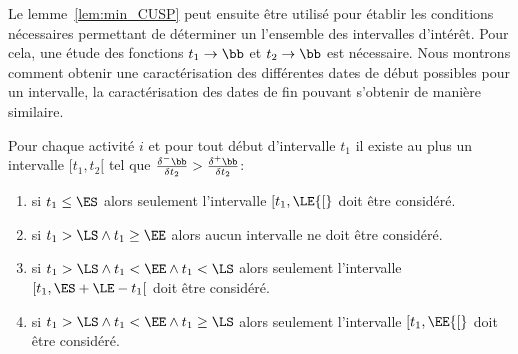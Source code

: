 Le lemme~\ref{lem:min_CUSP} peut ensuite être utilisé pour établir 
les conditions nécessaires permettant de déterminer un l'ensemble des
intervalles d'intérêt. Pour cela, une étude des fonctions $t_1
\rightarrow \bb$ et $t_2 \rightarrow \bb$ est nécessaire. Nous montrons
comment obtenir une caractérisation des différentes dates de début
possibles pour un intervalle, la caractérisation des dates de fin
pouvant s'obtenir de manière similaire.

\begin{lemma}
  Pour chaque activité $i$ et pour tout début d'intervalle $t_1$ il
  existe au plus un intervalle $[t_1,t_2[$ tel que
  $\frac{\delta^{-}\bb}{\delta t_2} >
  \frac{\delta^{+}\bb}{\delta t_2} $:
  \begin{enumerate}
  \item si $t_1 \le \ES$ alors seulement l'intervalle $[t_1,\LE {[}$ doit
    être considéré.
  \item si $t_1  > \LS \land t_1 \ge \EE$ alors aucun intervalle ne
    doit être considéré. 
  \item si $t_1  > \LS \land t_1 <\EE \land t_1 < \LS$ alors seulement
    l'intervalle $[t_1,\ES+\LE-t_1 [$ doit
    être considéré.
  \item si $t_1  > \LS \land t_1 <\EE \land t_1 \ge \LS$ alors
    seulement l'intervalle $[t_1,\EE {[}$ doit
    être considéré.
  \end{enumerate}
\end{lemma}

